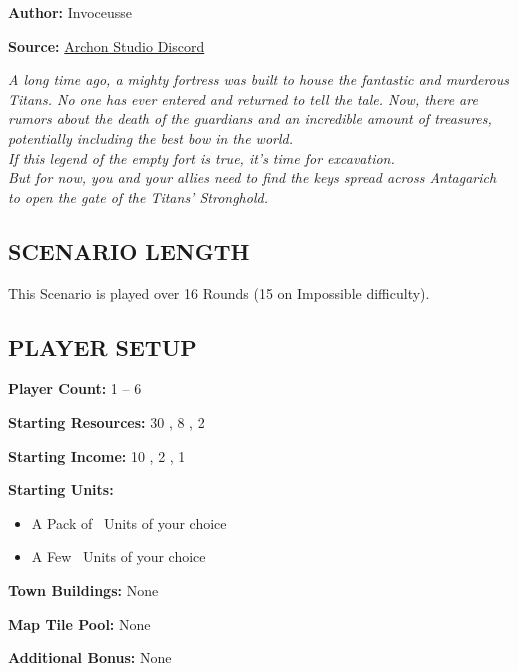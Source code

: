 
\begin{multicols*}{2}

\textbf{Author:} Invoceusse

\textbf{Source:} \href{https://discord.com/channels/740870068178649108/1219333721019256943}{Archon Studio Discord}

\textit{A long time ago, a mighty fortress was built to house the fantastic and murderous Titans.
  No one has ever entered and returned to tell the tale.
  Now, there are rumors about the death of the guardians and an incredible amount of treasures, potentially including the best bow in the world.\\
  If this legend of the empty fort is true, it's time for excavation.\\
  But for now, you and your allies need to find the keys spread across Antagarich to open the gate of the Titans' Stronghold.
}

\subsection*{\MakeUppercase{Scenario Length}}

This Scenario is played over 16 Rounds (15 on Impossible difficulty).

\subsection*{\MakeUppercase{Player Setup}}

\textbf{Player Count:} 1 -- 6

\textbf{Starting Resources:} 30 , 8 , 2 

\textbf{Starting Income:} 10 , 2 , 1 

\textbf{Starting Units:}
\begin{itemize}
  \item A Pack of \bronze\ Units of your choice
  \item A Few \bronze\ Units of your choice
\end{itemize}

\textbf{Town Buildings:} None

\textbf{Map Tile Pool:} None

\textbf{Additional Bonus:} None


\end{multicols*}
